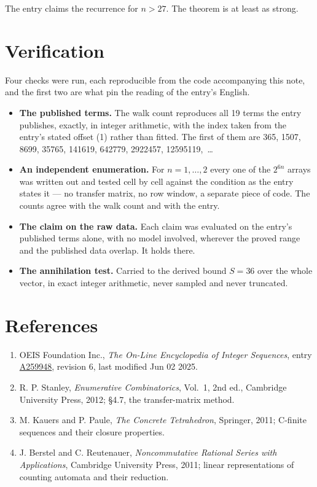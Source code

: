 \documentclass[11pt]{article}
\theoremstyle{definition}
\begin{document}
The entry claims the recurrence for $n > 27$. The theorem is at least as strong.

\section{Verification}

Four checks were run, each reproducible from the code accompanying this note, and the first two are what pin the reading of the entry's English.

\begin{itemize}

\item {\bfseries The published terms.} The walk count reproduces all 19 terms the entry publishes, exactly, in integer arithmetic, with the index taken from the entry's stated offset (1) rather than fitted. The first of them are 365, 1507, 8699, 35765, 141619, 642779, 2922457, 12595119,~\dots

\item {\bfseries An independent enumeration.} For $n = 1,\dots,2$ every one of the $2^{6n}$ arrays was written out and tested cell by cell against the condition as the entry states it --- no transfer matrix, no row window, a separate piece of code. The counts agree with the walk count and with the entry.

\item {\bfseries The claim on the raw data.} Each claim was evaluated on the entry's published terms alone, with no model involved, wherever the proved range and the published data overlap. It holds there.

\item {\bfseries The annihilation test.} Carried to the derived bound $S = 36$ over the whole vector, in exact integer arithmetic, never sampled and never truncated.

\end{itemize}

\section{References}

\begin{enumerate}

\item OEIS Foundation Inc., \emph{The On-Line Encyclopedia of Integer Sequences}, entry \href{https://oeis.org/A259948}{A259948}, revision 6, last modified Jun 02 2025.

\item R. P. Stanley, \emph{Enumerative Combinatorics}, Vol.~1, 2nd ed., Cambridge University Press, 2012; \S4.7, the transfer-matrix method.

\item M. Kauers and P. Paule, \emph{The Concrete Tetrahedron}, Springer, 2011; C-finite sequences and their closure properties.

\item J. Berstel and C. Reutenauer, \emph{Noncommutative Rational Series with Applications}, Cambridge University Press, 2011; linear representations of counting automata and their reduction.

\end{enumerate}
\end{document}
